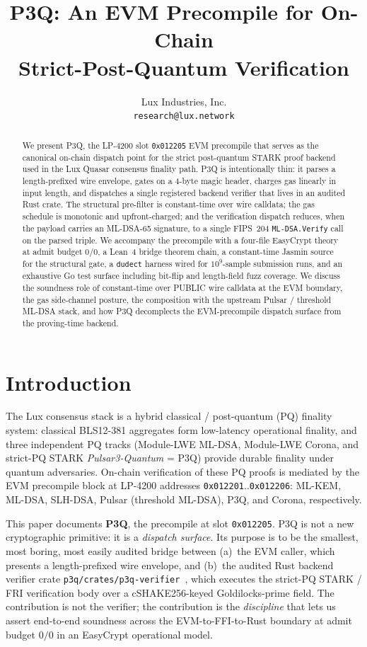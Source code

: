 \documentclass[11pt,a4paper]{article}
\title{P3Q: An EVM Precompile for On-Chain\\
Strict-Post-Quantum Verification}
\author{Lux Industries, Inc.\\
\texttt{research@lux.network}}
\date{}
\begin{document}
\maketitle

\begin{abstract}
We present P3Q, the LP-4200 slot \texttt{0x012205} EVM precompile that
serves as the canonical on-chain dispatch point for the strict
post-quantum STARK proof backend used in the Lux Quasar consensus
finality path. P3Q is intentionally thin: it parses a length-prefixed
wire envelope, gates on a 4-byte magic header, charges gas linearly in
input length, and dispatches a single registered backend verifier
that lives in an audited Rust crate. The structural pre-filter is
constant-time over wire calldata; the gas schedule is monotonic and
upfront-charged; and the verification dispatch reduces, when the
payload carries an ML-DSA-65 signature, to a single FIPS~204
\texttt{ML-DSA.Verify} call on the parsed triple. We accompany the
precompile with a four-file EasyCrypt theory at admit budget $0/0$, a
Lean~4 bridge theorem chain, a constant-time Jasmin source for the
structural gate, a \texttt{dudect} harness wired for $10^9$-sample
submission runs, and an exhaustive Go test surface including bit-flip
and length-field fuzz coverage. We discuss the soundness role of
constant-time over PUBLIC wire calldata at the EVM boundary, the gas
side-channel posture, the composition with the upstream Pulsar /
threshold ML-DSA stack, and how P3Q decomplects the EVM-precompile
dispatch surface from the proving-time backend.
\end{abstract}

\tableofcontents
\newpage

\section{Introduction}\label{sec:intro}

The Lux consensus stack is a hybrid classical / post-quantum (PQ)
finality system: classical BLS12-381 aggregates form low-latency
operational finality, and three independent PQ tracks
(Module-LWE ML-DSA, Module-LWE Corona, and strict-PQ STARK
\emph{Pulsar3-Quantum} = P3Q) provide durable finality under quantum
adversaries. On-chain verification of these PQ proofs is mediated by
the EVM precompile block at LP-4200 addresses
\texttt{0x012201}..\texttt{0x012206}: ML-KEM, ML-DSA, SLH-DSA, Pulsar
(threshold ML-DSA), P3Q, and Corona, respectively.

This paper documents \textbf{P3Q}, the precompile at slot
\texttt{0x012205}. P3Q is not a new cryptographic primitive: it is a
\emph{dispatch surface}. Its purpose is to be the smallest, most
boring, most easily audited bridge between (a)~the EVM caller, which
presents a length-prefixed wire envelope, and (b)~the audited Rust
backend verifier crate
\texttt{p3q/crates/p3q-verifier}~\cite{p3q-verifier}, which executes
the strict-PQ STARK / FRI verification body over a cSHAKE256-keyed
Goldilocks-prime field. The contribution is not the verifier; the
contribution is the \emph{discipline} that lets us assert end-to-end
soundness across the EVM-to-FFI-to-Rust boundary at admit budget
$0/0$ in an EasyCrypt operational model.
\end{document}
